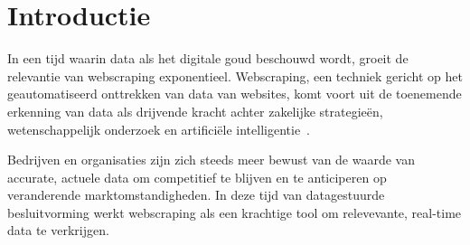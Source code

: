 
\section{Introductie}%
\label{sec:introductie}

In een tijd waarin data als het digitale goud beschouwd wordt, groeit de relevantie van webscraping exponentieel.
Webscraping, een techniek gericht op het geautomatiseerd onttrekken van data van websites, komt voort uit de toenemende 
erkenning van data als drijvende kracht achter zakelijke strategieën, wetenschappelijk onderzoek en artificiële intelligentie~\autocite{Oeztuerk2023}.

Bedrijven en organisaties zijn zich steeds meer bewust van de waarde van accurate, actuele data om competitief te blijven
en te anticiperen op veranderende marktomstandigheden. In deze tijd van datagestuurde besluitvorming werkt webscraping als
een krachtige tool om relevevante, real-time data te verkrijgen.

